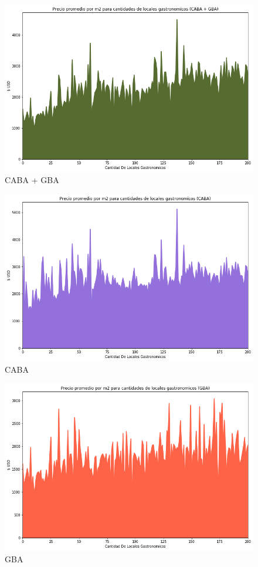 \documentclass[a4paper, 10pt]{article}
\begin{document}
				\begin{figure}[H]
    				\centering
    				\includegraphics[width=\textwidth]{images/17}
    				\caption{CABA + GBA}
				\end{figure}
				\begin{figure}[H]
    				\centering
    				\includegraphics[width=\textwidth]{images/18}
    				\caption{CABA}
				\end{figure}
				\begin{figure}[H]
    				\centering
    				\includegraphics[width=\textwidth]{images/19}
    				\caption{GBA}
				\end{figure}
				
\end{document}
